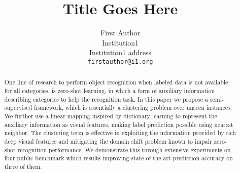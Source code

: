 \documentclass[10pt,twocolumn,letterpaper]{article}
\begin{document}
\title{Title Goes Here}
\author{First Author\\
Institution1\\
Institution1 address\\
{\tt\small firstauthor@i1.org} }

\maketitle

\begin{abstract}
One line of research to perform object recognition when labeled data is not available for all categories, is zero-shot learning,
in which a form of auxiliary information describing categories to help the recognition task.
In this paper we propose a semi-supervised framework, which is essentially a clustering problem over unseen instances. We further
use a linear mapping inspired by dictionary learning to represent the auxiliary information as visual features, making label prediction
possible using nearest neighbor. The clustering term is effective in exploiting the information provided by rich deep visual features and
mitigating the domain shift problem known to impair zero-shot recognition performance. We demonstrate this through extensive
experiments on four public benchmark which results improving state of the art prediction accuracy on three of them.
\end{abstract}
\end{document}
